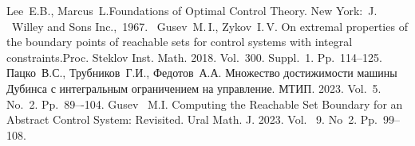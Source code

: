  




\begin{thebibliography}{9} %
Lee~E.B., Marcus~L.Foundations of Optimal Control Theory.
New York:~J. ~Willey and Sons Inc.,~1967.\
Gusev~M.\,I., Zykov~I.\,V. On extremal properties of the boundary points of reachable sets for control systems with integral constraints.Proc. Steklov Inst. Math. 2018. Vol.~300. Suppl.~1. Pp.~114--125.
\bibitem{PTF23}
Пацко~В.С., Трубников~Г.И., Федотов~А.А. Множество достижимости машины Дубинса с интегральным ограничением на управление. МТИП. 2023. Vol.~5. No.~2.  Pp.~89–-104.
\bibitem{G23}
Gusev~ M.I. Computing the Reachable Set Boundary for an Abstract Control System: Revisited. Ural Math. J. 2023. Vol.~ 9. No~2. Pp.~99--108.

\end{thebibliography}





%

